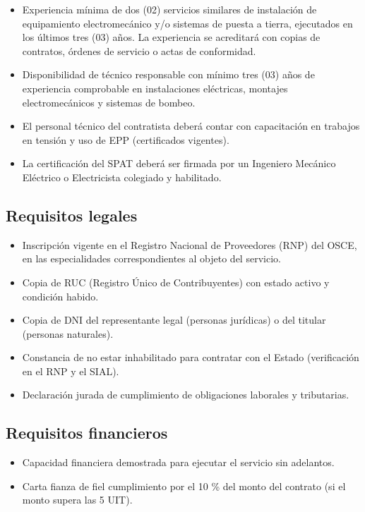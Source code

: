 \documentclass[12pt,a4paper]{article}
\begin{document}
\begin{itemize}
  \item Experiencia mínima de dos (02) servicios similares de instalación de equipamiento electromecánico y/o sistemas de puesta a tierra, ejecutados en los últimos tres (03) años. La experiencia se acreditará con copias de contratos, órdenes de servicio o actas de conformidad.
  \item Disponibilidad de técnico responsable con mínimo tres (03) años de experiencia comprobable en instalaciones eléctricas, montajes electromecánicos y sistemas de bombeo.
  \item El personal técnico del contratista deberá contar con capacitación en trabajos en tensión y uso de EPP (certificados vigentes).
  \item La certificación del SPAT deberá ser firmada por un Ingeniero Mecánico Eléctrico o Electricista colegiado y habilitado.
\end{itemize}

\subsection{Requisitos legales}

\begin{itemize}
  \item Inscripción vigente en el Registro Nacional de Proveedores (RNP) del OSCE, en las especialidades correspondientes al objeto del servicio.
  \item Copia de RUC (Registro Único de Contribuyentes) con estado activo y condición habido.
  \item Copia de DNI del representante legal (personas jurídicas) o del titular (personas naturales).
  \item Constancia de no estar inhabilitado para contratar con el Estado (verificación en el RNP y el SIAL).
  \item Declaración jurada de cumplimiento de obligaciones laborales y tributarias.
\end{itemize}

\subsection{Requisitos financieros}

\begin{itemize}
  \item Capacidad financiera demostrada para ejecutar el servicio sin adelantos.
  \item Carta fianza de fiel cumplimiento por el 10 \% del monto del contrato (si el monto supera las 5 UIT).
\end{itemize}
\end{document}
